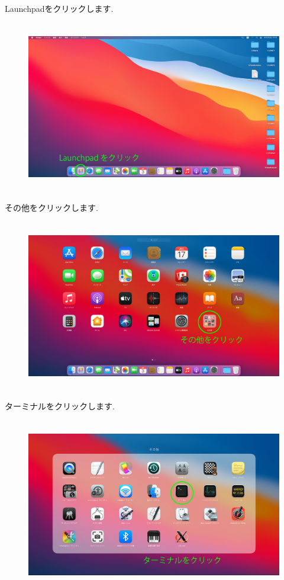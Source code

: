 \documentclass{jarticle}
\begin{document}
Launchpadをクリックします.\ 
\begin{figure}[H]
  \centering
  \includegraphics[height=7.5cm,pagebox=cropbox,clip]{fig/MacDesktopClickLaunchpad.png}
\end{figure}

\newpage
その他をクリックします.\ 
\begin{figure}[H]
  \centering
  \includegraphics[height=7.5cm]{fig/MacLaunchpadClickOther.png}
\end{figure}

ターミナルをクリックします.\ 
\begin{figure}[H]
  \centering
  \includegraphics[height=7.5cm]{fig/MacLaunchpadOtherClickTerminal.png}
\end{figure}
\end{document}
